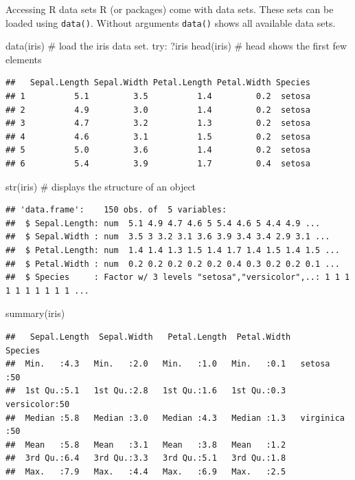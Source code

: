 \documentclass[
  9pt,
  ignorenonframetext,
]{beamer}
\newenvironment{Shaded}{\begin{snugshade}}{\end{snugshade}}
\newcommand{\CommentTok}[1]{\textcolor[rgb]{0.50,0.62,0.50}{#1}}
\newcommand{\KeywordTok}[1]{\textcolor[rgb]{0.94,0.87,0.69}{#1}}
\newcommand{\NormalTok}[1]{\textcolor[rgb]{0.80,0.80,0.80}{#1}}
\begin{document}
\begin{frame}[fragile]{Accessing R data sets}
\protect\hypertarget{accessing-r-data-sets}{}
R (or packages) come with data sets. These sets can be loaded using
\texttt{data()}. Without arguments \texttt{data()} shows all available
data sets.

\footnotesize
\vfill

\begin{Shaded}
\begin{Highlighting}[]
\KeywordTok{data}\NormalTok{(iris)  }\CommentTok{\# load the iris data set. try: ?iris}
\KeywordTok{head}\NormalTok{(iris)  }\CommentTok{\# head shows the first few elements}
\end{Highlighting}
\end{Shaded}

\begin{verbatim}
##   Sepal.Length Sepal.Width Petal.Length Petal.Width Species
## 1          5.1         3.5          1.4         0.2  setosa
## 2          4.9         3.0          1.4         0.2  setosa
## 3          4.7         3.2          1.3         0.2  setosa
## 4          4.6         3.1          1.5         0.2  setosa
## 5          5.0         3.6          1.4         0.2  setosa
## 6          5.4         3.9          1.7         0.4  setosa
\end{verbatim}

\begin{Shaded}
\begin{Highlighting}[]
\KeywordTok{str}\NormalTok{(iris)   }\CommentTok{\# displays the structure of an object}
\end{Highlighting}
\end{Shaded}

\begin{verbatim}
## 'data.frame':    150 obs. of  5 variables:
##  $ Sepal.Length: num  5.1 4.9 4.7 4.6 5 5.4 4.6 5 4.4 4.9 ...
##  $ Sepal.Width : num  3.5 3 3.2 3.1 3.6 3.9 3.4 3.4 2.9 3.1 ...
##  $ Petal.Length: num  1.4 1.4 1.3 1.5 1.4 1.7 1.4 1.5 1.4 1.5 ...
##  $ Petal.Width : num  0.2 0.2 0.2 0.2 0.2 0.4 0.3 0.2 0.2 0.1 ...
##  $ Species     : Factor w/ 3 levels "setosa","versicolor",..: 1 1 1 1 1 1 1 1 1 1 ...
\end{verbatim}

\begin{Shaded}
\begin{Highlighting}[]
\KeywordTok{summary}\NormalTok{(iris)}
\end{Highlighting}
\end{Shaded}

\begin{verbatim}
##   Sepal.Length  Sepal.Width   Petal.Length  Petal.Width        Species  
##  Min.   :4.3   Min.   :2.0   Min.   :1.0   Min.   :0.1   setosa    :50  
##  1st Qu.:5.1   1st Qu.:2.8   1st Qu.:1.6   1st Qu.:0.3   versicolor:50  
##  Median :5.8   Median :3.0   Median :4.3   Median :1.3   virginica :50  
##  Mean   :5.8   Mean   :3.1   Mean   :3.8   Mean   :1.2                  
##  3rd Qu.:6.4   3rd Qu.:3.3   3rd Qu.:5.1   3rd Qu.:1.8                  
##  Max.   :7.9   Max.   :4.4   Max.   :6.9   Max.   :2.5
\end{verbatim}
\end{frame}
\end{document}

